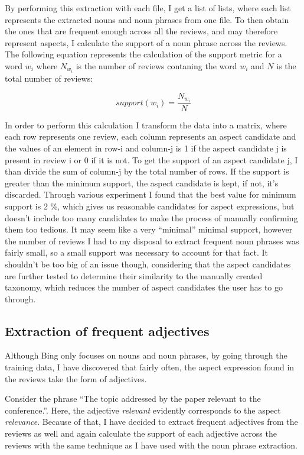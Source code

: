 By performing this extraction with each file, I get a list of lists, where each list represents the extracted nouns and noun phrases from one file. To then obtain the ones that are frequent enough across all the reviews, and may therefore represent aspects, I calculate the support of a noun phrase across the reviews. The following equation represents the calculation of the support metric for a word $w_{i}$ where $N_{w_{i}}$ is the number of reviews contaning the word $w_{i}$ and $N$ is the total number of reviews:


$$support(w_{i})=\frac{N_{w_{i}}}{N}$$

In order to perform this calculation I transform the data into a matrix, where each row represents one review, each column represents an aspect candidate and the values of an element in row-i and column-j is 1 if the aspect candidate j is present in review i or 0 if it is not. To get the support of an aspect candidate j, I than divide the sum of column-j by the total number of rows. If the support is greater than the minimum support, the aspect candidate is kept, if not, it's discarded. Through various experiment I found that the best value for minimum support is 2 \%, which gives us reasonable candidates for aspect expressions, but doesn't include too many candidates to make the process of manually confirming them too tedious. It may seem like a very ``minimal'' minimal support, however the number of reviews I had to my disposal to extract frequent noun phrases was fairly small, so a small support was necessary to account for that fact. It shouldn't be too big of an issue though, considering that the aspect candidates are further tested to determine their similarity to the manually created taxonomy, which reduces the number of aspect candidates the user has to go through.

\subsection{Extraction of frequent adjectives}
Although Bing only focuses on nouns and noun phrases, by going through the training data, I have discovered that fairly often, the aspect expression found in the reviews take the form of adjectives. 

Consider the phrase ``The topic addressed by the paper relevant to the conference.''. Here, the adjective \textit{relevant} evidently corresponds to the aspect \textit{relevance}. Because of that, I have decided to extract frequent adjectives from the reviews as well and again calculate the support of each adjective across the reviews with the same technique as I have used with the noun phrase extraction. 
